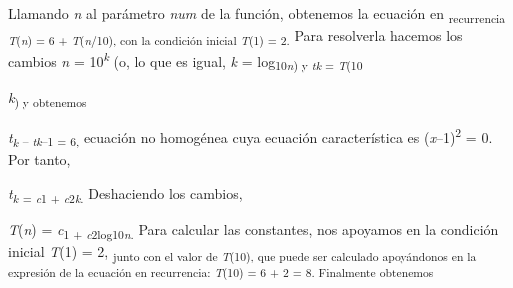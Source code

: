 \documentclass[12pt]{article}
\renewcommand{\_}{\kern-1.5pt\textunderscore\kern-1.5pt}
\begin{document}
\begin{adjustwidth}{0.77in}{0.57in}
{\fontsize{10pt}{12.0pt}\selectfont Llamando \textit{n }al parámetro \textit{num }de la función, obtenemos la ecuación en \textsubscript{recurrencia \textit{T}(\textit{n}) = 6 + \textit{T}(\textit{n}/10), con la condición inicial \textit{T}(1) = 2. }Para resolverla hacemos los cambios \textit{n }= 10\textit{\textsuperscript{k }}(o, lo que es igual, \textit{k }= log\textsubscript{10\textit{n}) y \textit{tk }= \textit{T}(10}{\fontsize{7pt}{8.4pt}\selectfont \textit{k}\textsubscript{) y obtenemos }\par}\par}\par

\end{adjustwidth}

\begin{adjustwidth}{0.77in}{0.8in}
\begin{Center}
{\fontsize{10pt}{12.0pt}\selectfont \textit{t\textsubscript{k }}\textsubscript{– \textit{tk}–1 = 6, }ecuación no homogénea cuya ecuación característica es (\textit{x}–1)\textsuperscript{2 }= 0. Por tanto, \par}
\end{Center}\par

\end{adjustwidth}

\begin{adjustwidth}{0.77in}{2.74in}
{\fontsize{10pt}{12.0pt}\selectfont \textit{t\textsubscript{k }}\textsubscript{= \textit{c}1 + \textit{c}2\textit{k}. }Deshaciendo los cambios, \par}\par

\end{adjustwidth}

\begin{adjustwidth}{0.77in}{0.57in}
\begin{Center}
{\fontsize{10pt}{12.0pt}\selectfont \textit{T}(\textit{n}) = \textit{c}\textsubscript{1 + \textit{c}2log10\textit{n}. }Para calcular las constantes, nos apoyamos en la condición inicial \textit{T}(1) = 2, \textsubscript{junto con el valor de \textit{T}(10), que puede ser calculado apoyándonos en la expresión de la ecuación en recurrencia: \textit{T}(10) = 6 + 2 = 8. Finalmente obtenemos }\par}
\end{Center}\par

\end{adjustwidth}
\end{document}
